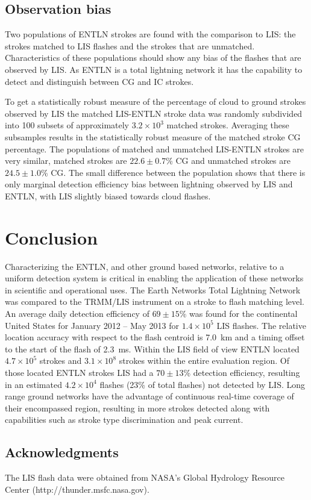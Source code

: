\subsection{Observation bias}

Two populations of ENTLN strokes are found with the comparison to LIS: the strokes matched to LIS flashes and the strokes that are unmatched.
Characteristics of these populations should show any bias of the flashes that are observed by LIS.
As ENTLN is a total lightning network it has the capability to detect and distinguish between CG and IC strokes.


To get a statistically robust measure of the percentage of cloud to ground strokes observed by LIS the matched LIS-ENTLN stroke data was randomly subdivided into 100 subsets of approximately $3.2\times10^3$ matched strokes.
Averaging these subsamples results in the statistically robust measure of the matched stroke CG percentage.
The populations of matched and unmatched LIS-ENTLN strokes are very similar, matched strokes are $22.6\pm0.7$\% CG and unmatched strokes are $24.5\pm1.0$\% CG.
The small difference between the population shows that there is only marginal detection efficiency bias between lightning observed by LIS and ENTLN, with LIS slightly biased towards cloud flashes.

\section{Conclusion}

Characterizing the ENTLN, and other ground based networks, relative to a uniform detection system is critical in enabling the application of these networks in scientific and operational uses.
The Earth Networks Total Lightning Network was compared to the TRMM/LIS instrument on a stroke to flash matching level.
An average daily detection efficiency of $69\pm 15$\% was found for the continental United States for January 2012 -- May 2013 for $1.4 \times 10^5$ LIS flashes.
The relative location accuracy with respect to the flash centroid is 7.0~km and a timing offset to the start of the flash of 2.3~ms.
Within the LIS field of view ENTLN located $4.7\times 10^5$ strokes and $3.1\times10^8$ strokes within the entire evaluation region.
Of those located ENTLN strokes LIS had a $70 \pm 13$\% detection efficiency, resulting in an estimated $4.2 \times 10^4$ flashes (23\% of total flashes) not detected by LIS.
Long range ground networks have the advantage of continuous real-time coverage of their encompassed region, resulting in more strokes detected along with capabilities such as stroke type discrimination and peak current.

\subsection*{Acknowledgments}

The LIS flash data were obtained from NASA's Global Hydrology Resource Center (http://thunder.msfc.nasa.gov).
